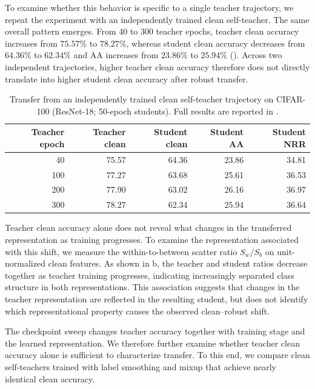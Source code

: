 To examine whether this behavior is specific to a single teacher trajectory,
we repeat the experiment with an independently trained clean self-teacher.
The same overall pattern emerges.
From 40 to 300 teacher epochs, teacher clean accuracy increases from
\(75.57\%\) to \(78.27\%\), whereas student clean accuracy decreases from
\(64.36\%\) to \(62.34\%\) and AA increases from \(23.86\%\) to
\(25.94\%\) ().
Across two independent trajectories, higher teacher clean accuracy therefore
does not directly translate into higher student clean accuracy after robust
transfer.


\begin{table}[!htbp]
  \centering
  \small
  \setlength{\tabcolsep}{6pt}
  \caption{
  Transfer from an independently trained clean self-teacher trajectory on
  CIFAR-100 (ResNet-18; 50-epoch students).
  Full results are reported in .
  }
  \label{tab:teachertrajectory}
  \begin{tabular}{rrrrr}
    \toprule
    Teacher epoch & Teacher clean & Student clean & Student AA & Student NRR \\
    \midrule
    40  & 75.57 & 64.36 & 23.86 & 34.81 \\
    100 & 77.27 & 63.68 & 25.61 & 36.53 \\
    200 & 77.90 & 63.02 & 26.16 & 36.97 \\
    300 & 78.27 & 62.34 & 25.94 & 36.64 \\
    \bottomrule
  \end{tabular}
\end{table}


Teacher clean accuracy alone does not reveal what changes in the transferred
representation as training progresses.
To examine the representation associated with this shift, we measure the
within-to-between scatter ratio \(S_w/S_b\) on unit-normalized clean features.
As shown in b, the teacher and student ratios decrease
together as teacher training progresses, indicating increasingly separated
class structure in both representations.
This association suggests that changes in the teacher representation are
reflected in the resulting student, but does not identify which
representational property causes the observed clean--robust shift.

The checkpoint sweep changes teacher accuracy together with training stage and
the learned representation.
We therefore further examine whether teacher clean accuracy alone is
sufficient to characterize transfer.
To this end, we compare clean self-teachers trained with label smoothing and
mixup that achieve nearly identical clean accuracy.


